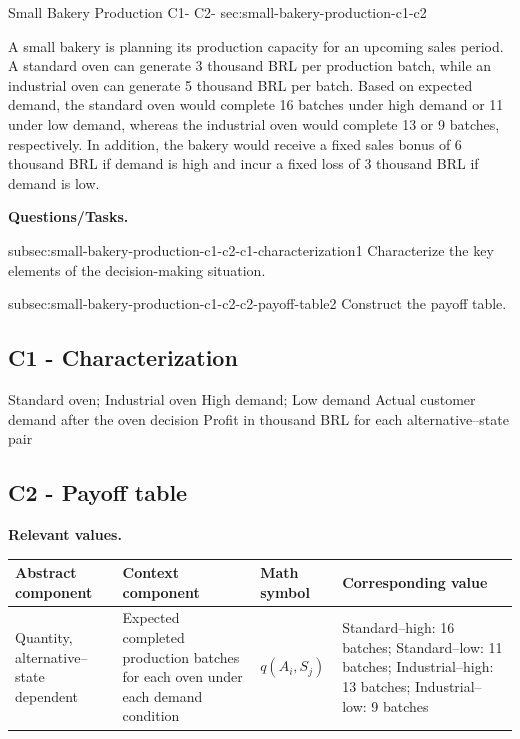 	\sectionScored
	{Small Bakery Production}
	{C1- \hspace{2mm} C2-}
	{sec:small-bakery-production-c1-c2}
	{
		A small bakery is planning its production capacity for an upcoming sales period. A standard oven can generate 3 thousand BRL per production batch, while an industrial oven can generate 5 thousand BRL per batch. Based on expected demand, the standard oven would complete 16 batches under high demand or 11 under low demand, whereas the industrial oven would complete 13 or 9 batches, respectively. In addition, the bakery would receive a fixed sales bonus of 6 thousand BRL if demand is high and incur a fixed loss of 3 thousand BRL if demand is low.
		
		\textbf{Questions/Tasks.}
		\begin{enumerate}
			\CriterionTask
			{subsec:small-bakery-production-c1-c2-c1-characterization}{1}
			{Characterize the key elements of the decision-making situation. }
			
			\CriterionTask
			{subsec:small-bakery-production-c1-c2-c2-payoff-table}{2}
			{Construct the payoff table. }
		\end{enumerate}
		
		\label{subsec:small-bakery-production-c1-c2-c1-characterization}
		\subsection*{C1 - Characterization }
		
		\DecisionElementsTable
		{Standard oven; Industrial oven}
		{High demand; Low demand}
		{Actual customer demand after the oven decision}
		{Profit in thousand BRL for each alternative--state pair}
		
		\label{subsec:small-bakery-production-c1-c2-c2-payoff-table}
		\subsection*{C2 - Payoff table }
		
		\textbf{Relevant values.}
		
		\begin{center}
			\small
			\begin{tabularx}{\textwidth}{
					>{\raggedright\arraybackslash}X
					>{\raggedright\arraybackslash}X
					>{\centering\arraybackslash}p{}
					>{\raggedright\arraybackslash}X
				}
				\toprule
				Abstract component & Context component & Math symbol & Corresponding value \\
				\midrule
				Quantity, alternative--state dependent
				&
				Expected completed production batches for each oven under each demand condition
				&
				$q(A_i,S_j)$
				&
				Standard--high: 16 batches; Standard--low: 11 batches; Industrial--high: 13 batches; Industrial--low: 9 batches
				\\
				

\end{tabularx}
\end{center}}
